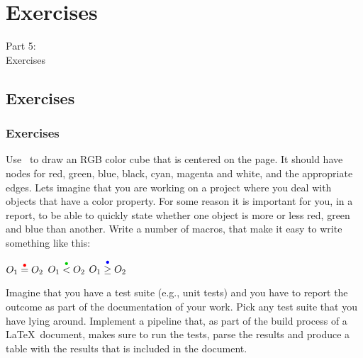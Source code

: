 {
\renewcommand{\bgcolor}{exercises}

\section{Exercises}
\begin{frame}
  \vspace{25mm}
  \begin{center}
    \Huge{Part 5\pause:\\Exercises}
  \end{center}
\end{frame}

\subsection{Exercises}
\begin{frame}[fragile]
  \frametitle{Exercises}
  \vspace{1mm}
  \begin{enumerate}
     Use \TikZ\ to draw an RGB color cube that is centered on the page. It should have nodes for red, green, blue, black, cyan, magenta and white, and the appropriate edges.
     Lets imagine that you are working on a project where you deal with objects that have a color property. For some reason it is important for you, in a report, to be able to quickly state whether one object is more or less red, green and blue than another. Write a number of macros, that make it easy to write something like this:
      \begin{center}
        $O_1 \overset{\textcolor{red}{\bullet}}{=} O_2$
        \hspace{2cm}
        $O_1 \overset{\textcolor{green!80!black}{\bullet}}{<} O_2$
        \hspace{2cm}
        $O_1 \overset{\textcolor{blue}{\bullet}}{\geq} O_2$
      \end{center}
     Imagine that you have a test suite (e.g., unit tests) and you have to report the outcome as part of the documentation of your work. Pick any test suite that you have lying around. Implement a pipeline that, as part of the build process of a \LaTeX\ document, makes sure to run the tests, parse the results and produce a table with the results that is included in the document.
  \end{enumerate}
\end{frame}

}

